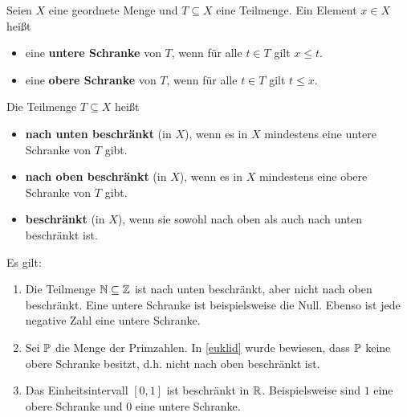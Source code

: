 \begin{de}[Schranken] \label{def:schranken}  
    Seien $X$ eine geordnete Menge und $T\subseteq X$ eine Teilmenge. Ein Element $x\in X$ heißt
    \begin{itemize}
        \item eine \textbf{untere Schranke} von $T$, wenn für alle $t\in T$ gilt $x\le t$.
        \item eine \textbf{obere Schranke} von $T$, wenn für alle $t\in T$ gilt $t\le x$.
    \end{itemize}
    Die Teilmenge $T\subseteq X$ heißt
    \begin{itemize}
        \item \textbf{nach unten beschränkt} (in $X$), wenn es in $X$ mindestens eine untere Schranke von $T$ gibt.
        \item \textbf{nach oben beschränkt} (in $X$), wenn es in $X$ mindestens eine obere Schranke von $T$ gibt.
        \item \textbf{beschränkt} (in $X$), wenn sie sowohl nach oben als auch nach unten beschränkt ist.
    \end{itemize}
\end{de}


\begin{bsp}
    Es gilt:
    \begin{enumerate}
        \item Die Teilmenge $\mathbb N\subseteq \mathbb Z$ ist nach unten beschränkt, aber nicht nach oben beschränkt. Eine untere Schranke ist beispielsweise die Null. Ebenso ist jede negative Zahl eine untere Schranke.
        \item Sei $\mathbb P$ die Menge der Primzahlen. In \cref{euklid} wurde bewiesen, dass $\mathbb P$ keine obere Schranke besitzt, d.h. nicht nach oben beschränkt ist.
        \item Das Einheitsintervall $[0,1]$ ist beschränkt in $\mathbb R$. Beispielsweise sind $1$ eine obere Schranke und $0$ eine untere Schranke.
    \end{enumerate}
\end{bsp}


